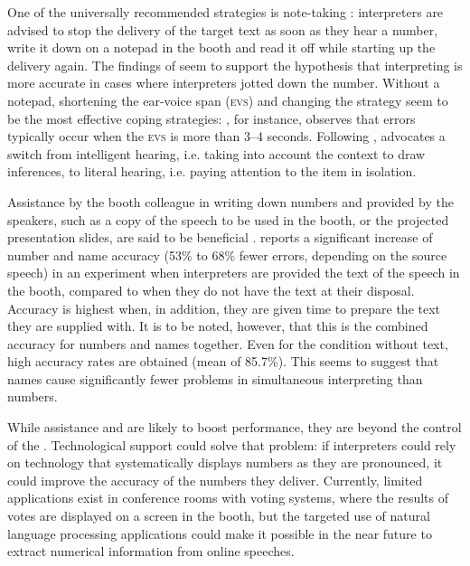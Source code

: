 \documentclass[output=paper]{langsci/langscibook}
\begin{document}
One of the universally recommended strategies is note-taking \citep{Setton1999,Jones2002,Mead2015}: interpreters are advised to stop the delivery of the target text as soon as they hear a number, write it down on a notepad in the booth and read it off while starting up the delivery again. The findings of \citet{Mazza2001} seem to support the hypothesis that interpreting is more accurate in cases where interpreters jotted down the number. Without a notepad, shortening the ear-voice span (\textsc{evs}) and changing the  strategy seem to be the most effective coping strategies: \citet{Setton1999}, for instance, observes that errors typically occur when the \textsc{evs} is more than 3--4 seconds. Following \citet{Seleskovitch1975}, \citet{Pinochi2009} advocates a switch from intelligent hearing, i.e. taking into account the context to draw inferences, to literal hearing, i.e. paying attention to the item in isolation.

Assistance by the booth colleague in writing down numbers and  provided by the speakers, such as a copy of the speech to be used in the booth, or the projected presentation slides, are said to be beneficial \citep{Mead2015}. \citet{Lamberger-Felber2001} reports a significant increase of number and name accuracy (53\% to 68\% fewer errors, depending on the source speech) in an experiment when interpreters are provided the text of the speech in the booth, compared to when they do not have the text at their disposal. Accuracy is highest when, in addition, they are given time to prepare the text they are supplied with. It is to be noted, however, that this is the combined accuracy for numbers and names together. Even for the condition without text, high accuracy rates are obtained (mean of 85.7\%). This seems to suggest that names cause significantly fewer problems in simultaneous interpreting than numbers.\largerpage[-1]

While assistance and  are likely to boost performance, they are beyond the control of the . Technological support could solve that problem: if interpreters could rely on technology that systematically displays numbers as they are pronounced, it could improve the accuracy of the numbers they deliver. Currently, limited applications exist in conference rooms with voting systems, where the results of votes are displayed on a screen in the booth, but the targeted use of natural language processing applications could make it possible in the near future to extract numerical information from online speeches. 
\end{document}

